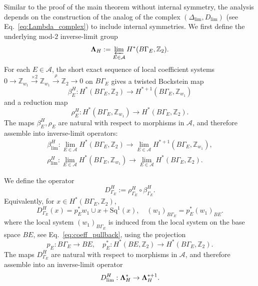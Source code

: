 \documentclass[aps,prx,reprint,superscriptaddress,twocolumn,amsmath,amssymb,amsfonts, nofootinbib]{revtex4-2}
\newcommand{\Z}{\mathbb{Z}}
\theoremstyle{apsstyle}
\begin{document}
Similar to the proof of the main theorem without internal symmetry, the analysis depends on the construction of the analog of the complex $(\Delta_{\lim}, D_{\lim})$ (see Eq.~\ref{eq:Lambda_complex}) to include internal symmetries. We first define the underlying mod-$2$ inverse-limit group
\begin{equation}
{\bf \Lambda}_{H} := \varprojlim_{E\in\mathcal A} H^{*}(B\Gamma_E,\Z_{2}).
\label{eq:Lambda_H_def}
\end{equation}
For each $E\in\mathcal A$, the short exact sequence of local coefficient systems $0\to \mathbb Z_{w_1} \xrightarrow{\times 2} \mathbb Z_{w_1}
\xrightarrow{\rho} \mathbb Z_2 \to 0$ on $B\Gamma_E$ gives a twisted Bockstein map
\begin{equation}
\beta_{E}^{H}: H^{*}(B\Gamma_E,\Z_{2}) \to H^{*+1}(B\Gamma_E,\Z_{w_1})
\end{equation}
and a reduction map
\begin{equation}
\rho_{E}^{H}: H^{*}(B\Gamma_E,\Z_{w_1}) \to H^{*}(B\Gamma_E,\Z_{2}).
\end{equation}
The maps $\beta_{E}^{H},\rho_{E}$ are natural with respect to morphisms in $\mathcal A$, and therefore assemble into inverse-limit operators:
\begin{gather}
    \label{eq:beta_lim_H}
    \beta_{\lim}^{H}: \lim_{E\in \mathcal{A}}H^{*}(B\Gamma_E,\Z_{2}) \to \lim_{E\in \mathcal{A}}H^{*+1}(B\Gamma_E,\Z_{w_1}),\\
    \rho_{\lim}^{H}: \lim_{E\in \mathcal{A}} H^{*}(B\Gamma_E,\Z_{w_1}) \to \lim_{E\in \mathcal{A}} H^{*}(B\Gamma_E,\Z_{2}).
    \label{eq:rho_lim_H}
\end{gather}

\bigskip 
\noindent We define the operator
\begin{equation}
D_{\Gamma_E}^{H}:= \rho_{\Gamma_E}^{H}\circ\beta_{\Gamma_E}^{H}.
\label{eq:D_Gamma_E_H_def}
\end{equation}
Equivalently, for $x\in H^{*}(B\Gamma_E,\Z_2)$,
\begin{equation}
D_{\Gamma_E}^{H}(x) = p_E^{*}w_1\cup x+\mathrm{Sq}^{1}(x),\quad (w_{1})_{B\Gamma_{E}}=p_{E}^{*}(w_{1})_{BE}.
\label{eq:D_Gamma_E_H_formula}
\end{equation}
where the local system $(w_{1})_{B\Gamma_{E}}$ is induced from the local system on the base space $BE$, see Eq.~\ref{eq:coeff_pullback}, using the projection
\begin{equation*}
    p_{E}: B\Gamma_{E} \to BE, \quad p_{E}^{*}: H^{*}(BE, \Z_{2}) \to H^{*}(B\Gamma_E, \Z_{2}).
\end{equation*}
The maps $D_{\Gamma_E}^{H}$ are natural with respect to morphisms in $\mathcal A$, and therefore assemble into an inverse-limit operator
\begin{equation}
D_{\lim}^{H}: {\bf \Lambda}_{H}^{*} \to {\bf \Lambda}_{H}^{*+1}.
\label{eq:D_lim_H_def}
\end{equation}
\end{document}
